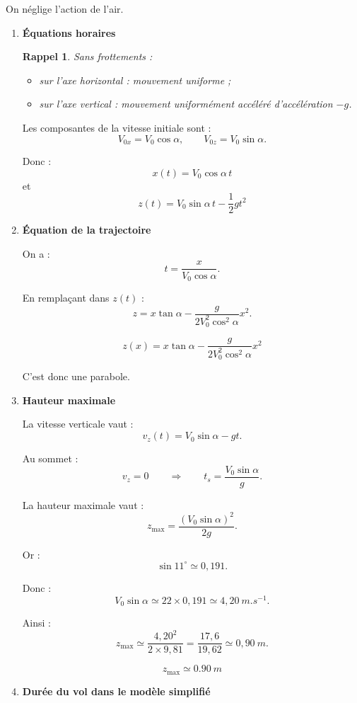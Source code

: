 \documentclass[11pt,a4paper]{article}
\newtheorem*{rappel}{Rappel}
\begin{document}
On néglige l’action de l’air.

\begin{enumerate}[label=\textbf{3.\arabic*}, resume, leftmargin=1.6em]

\item \textbf{Équations horaires}

\begin{rappel}
Sans frottements :
\begin{itemize}
    \item sur l’axe horizontal : mouvement uniforme ;
    \item sur l’axe vertical : mouvement uniformément accéléré d’accélération \(-g\).
\end{itemize}
\end{rappel}

Les composantes de la vitesse initiale sont :
\[
V_{0x}=V_0\cos\alpha,
\qquad
V_{0z}=V_0\sin\alpha.
\]

Donc :
\[
\boxed{x(t)=V_0\cos\alpha\, t}
\]
et
\[
\boxed{z(t)=V_0\sin\alpha\, t-\frac12 gt^2}
\]

\item \textbf{Équation de la trajectoire}

On a :
\[
t=\frac{x}{V_0\cos\alpha}.
\]

En remplaçant dans \(z(t)\) :
\[
z=x\tan\alpha-\frac{g}{2V_0^2\cos^2\alpha}x^2.
\]

\[
\boxed{
z(x)=x\tan\alpha-\frac{g}{2V_0^2\cos^2\alpha}x^2
}
\]

C’est donc une parabole.

\item \textbf{Hauteur maximale}

La vitesse verticale vaut :
\[
v_z(t)=V_0\sin\alpha-gt.
\]

Au sommet :
\[
v_z=0
\qquad\Longrightarrow\qquad
t_s=\frac{V_0\sin\alpha}{g}.
\]

La hauteur maximale vaut :
\[
z_{\max}=\frac{(V_0\sin\alpha)^2}{2g}.
\]

Or :
\[
\sin 11^\circ \simeq 0{,}191.
\]

Donc :
\[
V_0\sin\alpha \simeq 22\times 0{,}191 \simeq 4{,}20\ \si{m.s^{-1}}.
\]

Ainsi :
\[
z_{\max}\simeq \frac{4{,}20^2}{2\times 9{,}81}
=\frac{17{,}6}{19{,}62}
\simeq 0{,}90\ \si{m}.
\]

\[
\boxed{z_{\max}\simeq \SI{0,90}{m}}
\]

\item \textbf{Durée du vol dans le modèle simplifié}


\end{enumerate}
\end{document}
